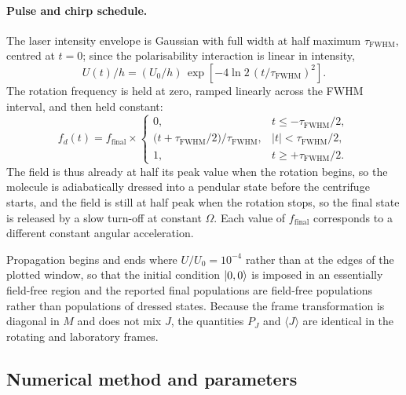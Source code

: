 \paragraph{Pulse and chirp schedule.}
The laser intensity envelope is Gaussian with full width at half maximum
$\tau_{\mathrm{FWHM}}$, centred at $t=0$; since the polarisability interaction
is linear in intensity,
%
\begin{equation}
  U(t)/h = (U_0/h)\,\exp\!\left[-4\ln 2\,(t/\tau_{\mathrm{FWHM}})^2\right].
  \label{eq:app-envelope}
\end{equation}
%
The rotation frequency is held at zero, ramped linearly across the FWHM
interval, and then held constant:
%
\begin{equation}
  f_d(t) = f_{\mathrm{final}}\times
  \begin{cases}
    0, & t \le -\tau_{\mathrm{FWHM}}/2,\\[2pt]
    \bigl(t+\tau_{\mathrm{FWHM}}/2\bigr)/\tau_{\mathrm{FWHM}},
      & |t| < \tau_{\mathrm{FWHM}}/2,\\[2pt]
    1, & t \ge +\tau_{\mathrm{FWHM}}/2 .
  \end{cases}
  \label{eq:app-chirp}
\end{equation}
%
The field is thus already at half its peak value when the rotation begins, so
the molecule is adiabatically dressed into a pendular state before the
centrifuge starts, and the field is still at half peak when the rotation stops,
so the final state is released by a slow turn-off at constant $\Omega$. Each
value of $f_{\mathrm{final}}$ corresponds to a different constant angular
acceleration.

Propagation begins and ends where $U/U_0=10^{-4}$ rather than at the edges of
the plotted window, so that the initial condition $\ket{0,0}$ is imposed in an
essentially field-free region and the reported final populations are
field-free populations rather than populations of dressed states. Because the
frame transformation is diagonal in $M$ and does not mix $J$, the quantities
$P_J$ and $\langle J\rangle$ are identical in the rotating and laboratory
frames.

\subsection{Numerical method and parameters}
\label{app:centrifuge-numerics}


